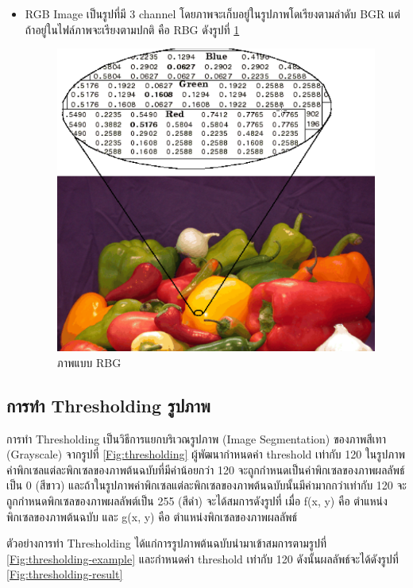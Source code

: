 \begin{itemize}
		\item RGB Image เป็นรูปที่มี 3 channel 
		โดยภาพจะเก็บอยู่ในรูปภาพโดเรียงตามลำดับ BGR 
		แต่ถ้าอยู่ในไฟล์ภาพจะเรียงตามปกติ คือ RBG 
		ดังรูปที่ \ref{Fig:rbg-image }
		\begin{figure}[H]
			\centering
			\includegraphics[scale=0.7]{Figures/2/rbg-image}
			\caption{ภาพแบบ RBG }
			\label{Fig:rbg-image }
		\end{figure}
	\end{itemize}

	\subsection{การทำ Thresholding รูปภาพ}
		การทำ Thresholding เป็นวิธีการแยกบริเวณรูปภาพ (Image Segmentation) ของภาพสีเทา (Grayscale) 
		จากรูปที่ \ref{Fig:thresholding} ผู้พัฒนากำหนดค่า threshold เท่ากับ 120 
		ในรูปภาพค่าพิกเซลแต่ละพิกเซลของภาพต้นฉบับที่มีค่าน้อยกว่า 120 
		จะถูกกำหนดเป็นค่าพิกเซลของภาพผลลัพธ์เป็น 0 (สีขาว) และถ้าในรูปภาพค่าพิกเซลแต่ละพิกเซลของภาพต้นฉบับนั้นมีค่ามากกว่าเท่ากับ 120 จะถูกกำหนดพิกเซลของภาพผลลัพต์เป็น 255 (สีดำ) จะได้สมการดังรูปที่  เมื่อ f(x, y) คือ ตำแหน่งพิกเซลของภาพต้นฉบับ และ g(x, y) คือ ตำแหน่งพิกเซลของภาพผลลัพธ์

		ตัวอย่างการทำ Thresholding ได้แก่การรูปภาพต้นฉบับนำมาเข้าสมการตามรูปที่ \ref{Fig:thresholding-example} และกำหนดค่า threshold เท่ากับ 120 ดังนั้นผลลัพธ์จะได้ดังรูปที่ \ref{Fig:thresholding-result}
		
